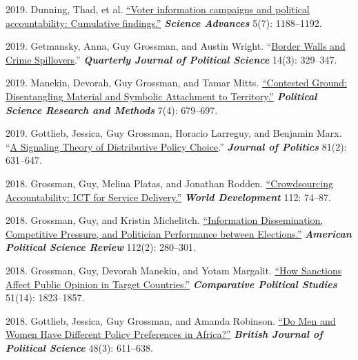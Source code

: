 \documentclass[10pt,a4paper]{article}
\begin{document}
\begin{etaremune}[leftmargin=2.5em, itemsep=8pt, topsep=4pt]
\item \textcolor{secondary}{2019.} Dunning, Thad, et al. \href{https://advances.sciencemag.org/content/5/7/eaaw2612}{``Voter information campaigns and political accountability: Cumulative findings.''} \textbf{\textit{Science Advances}} 5(7): 1188--1192.

\item \textcolor{secondary}{2019.} Getmansky, Anna, Guy Grossman, and Austin Wright. ``\href{https://www.nowpublishers.com/article/Details/QJPS-18094}{Border Walls and Crime Spillovers}.'' \textbf{\textit{Quarterly Journal of Political Science}} 14(3): 329--347.

\item \textcolor{secondary}{2019.} Manekin, Devorah, Guy Grossman, and Tamar Mitts. \href{https://bit.ly/2HPdZT3}{``Contested Ground: Disentangling Material and Symbolic Attachment to Territory.''} \textbf{\textit{Political Science Research and Methods}} 7(4): 679--697.

\item \textcolor{secondary}{2019.} Gottlieb, Jessica, Guy Grossman, Horacio Larreguy, and Benjamin Marx. ``\href{https://bit.ly/2OUL9WP}{A Signaling Theory of Distributive Policy Choice}.'' \textbf{\textit{Journal of Politics}} 81(2): 631--647.

\item \textcolor{secondary}{2018.} Grossman, Guy, Melina Platas, and Jonathan Rodden. \href{https://bit.ly/2NkW1LT}{``Crowdsourcing Accountability: ICT for Service Delivery.''} \textbf{\textit{World Development}} 112: 74--87.

\item \textcolor{secondary}{2018.} Grossman, Guy, and Kristin Michelitch. \href{https://bit.ly/2FTkhR6}{``Information Dissemination, Competitive Pressure, and Politician Performance between Elections.''} \textbf{\textit{American Political Science Review}} 112(2): 280--301.

\item \textcolor{secondary}{2018.} Grossman, Guy, Devorah Manekin, and Yotam Margalit. \href{https://doi.org/10.1177/0010414018774370}{``How Sanctions Affect Public Opinion in Target Countries.''} \textbf{\textit{Comparative Political Studies}} 51(14): 1823--1857.

\item \textcolor{secondary}{2018.} Gottlieb, Jessica, Guy Grossman, and Amanda Robinson. \href{https://bit.ly/2Wo3hvc}{``Do Men and Women Have Different Policy Preferences in Africa?''} \textbf{\textit{British Journal of Political Science}} 48(3): 611--638.


\end{etaremune}
\end{document}
